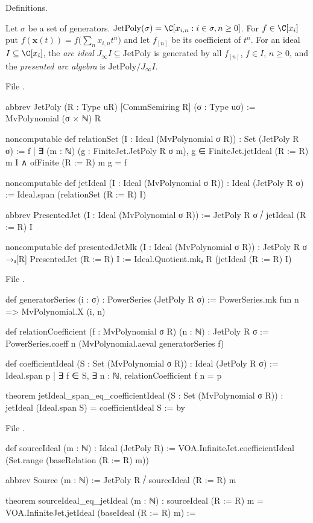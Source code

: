 \begin{status}
Definitions.
\end{status}

\begin{definition}\label{l20:def:jet}
Let $\sigma$ be a set of generators. $\mathrm{JetPoly}(\sigma)=\C[x_{i,n}: i\in\sigma,n\ge0]$. For $f\in\C[x_i]$
put $f(\mathbf x(t))=f\bigl(\sum_nx_{i,n}t^n\bigr)$ and let $f_{[n]}$ be its coefficient of $t^n$. For an ideal
$I\subseteq\C[x_i]$, the \emph{arc ideal} $J_\infty I\subseteq\mathrm{JetPoly}$ is generated by all
$f_{[n]}$, $f\in I$, $n\ge0$, and the \emph{presented arc algebra} is $\mathrm{JetPoly}/J_\infty I$.
\end{definition}
\noindent File .
\begin{leancode}
abbrev JetPoly (R : Type uR) [CommSemiring R] (σ : Type uσ) :=
  MvPolynomial (σ × ℕ) R

noncomputable def relationSet (I : Ideal (MvPolynomial σ R)) : Set (JetPoly R σ) :=
  {f | ∃ (m : ℕ) (g : FiniteJet.JetPoly R σ m),
    g ∈ FiniteJet.jetIdeal (R := R) m I ∧ ofFinite (R := R) m g = f}

noncomputable def jetIdeal (I : Ideal (MvPolynomial σ R)) : Ideal (JetPoly R σ) :=
  Ideal.span (relationSet (R := R) I)

abbrev PresentedJet (I : Ideal (MvPolynomial σ R)) :=
  JetPoly R σ ⧸ jetIdeal (R := R) I

noncomputable def presentedJetMk (I : Ideal (MvPolynomial σ R)) :
    JetPoly R σ →ₐ[R] PresentedJet (R := R) I :=
  Ideal.Quotient.mkₐ R (jetIdeal (R := R) I)
\end{leancode}
\noindent File .
\begin{leancode}
def generatorSeries (i : σ) : PowerSeries (JetPoly R σ) :=
  PowerSeries.mk fun n => MvPolynomial.X (i, n)

def relationCoefficient (f : MvPolynomial σ R) (n : ℕ) : JetPoly R σ :=
  PowerSeries.coeff n (MvPolynomial.aeval generatorSeries f)

def coefficientIdeal (S : Set (MvPolynomial σ R)) : Ideal (JetPoly R σ) :=
  Ideal.span {p | ∃ f ∈ S, ∃ n : ℕ, relationCoefficient f n = p}

theorem jetIdeal_span_eq_coefficientIdeal (S : Set (MvPolynomial σ R)) :
    jetIdeal (Ideal.span S) = coefficientIdeal S := by
\end{leancode}
\noindent File .
\begin{leancode}
def sourceIdeal (m : ℕ) : Ideal (JetPoly R) :=
  VOA.InfiniteJet.coefficientIdeal (Set.range (baseRelation (R := R) m))

abbrev Source (m : ℕ) := JetPoly R ⧸ sourceIdeal (R := R) m

theorem sourceIdeal_eq_jetIdeal (m : ℕ) :
    sourceIdeal (R := R) m = VOA.InfiniteJet.jetIdeal (baseIdeal (R := R) m) :=
\end{leancode}

